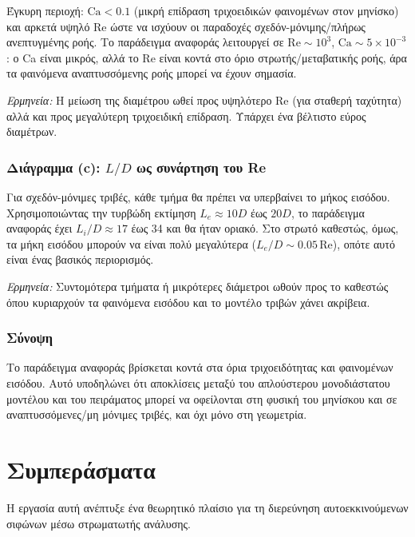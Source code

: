 \documentclass[11pt]{article}
\begin{document}
Έγκυρη περιοχή: $\text{Ca} < 0.1$ (μικρή επίδραση τριχοειδικών φαινομένων στον μηνίσκο) και αρκετά υψηλό Re ώστε να ισχύουν οι παραδοχές σχεδόν-μόνιμης/πλήρως ανεπτυγμένης ροής. Το παράδειγμα αναφοράς λειτουργεί σε $\text{Re} \sim 10^3$, $\text{Ca} \sim 5\times 10^{-3}$: ο Ca είναι μικρός, αλλά το Re είναι κοντά στο όριο στρωτής/μεταβατικής ροής, άρα τα φαινόμενα αναπτυσσόμενης ροής μπορεί να έχουν σημασία.

\emph{Ερμηνεία:} Η μείωση της διαμέτρου ωθεί προς υψηλότερο Re (για σταθερή ταχύτητα) αλλά και προς μεγαλύτερη τριχοειδική επίδραση. Υπάρχει ένα βέλτιστο εύρος διαμέτρων.

\subsubsection{Διάγραμμα (c): $L/D$ ως συνάρτηση του Re}

Για σχεδόν-μόνιμες τριβές, κάθε τμήμα θα πρέπει να υπερβαίνει το μήκος εισόδου. Χρησιμοποιώντας την τυρβώδη εκτίμηση $L_e \approx 10D$ έως $20D$, το παράδειγμα αναφοράς έχει $L_i/D \approx 17$ έως 34 και θα ήταν οριακό. Στο στρωτό καθεστώς, όμως, τα μήκη εισόδου μπορούν να είναι πολύ μεγαλύτερα ($L_e/D \sim 0.05\,\text{Re}$), οπότε αυτό είναι ένας βασικός περιορισμός.

\emph{Ερμηνεία:} Συντομότερα τμήματα ή μικρότερες διάμετροι ωθούν προς το καθεστώς όπου κυριαρχούν τα φαινόμενα εισόδου και το μοντέλο τριβών χάνει ακρίβεια.

\subsubsection{Σύνοψη}

Το παράδειγμα αναφοράς βρίσκεται κοντά στα όρια τριχοειδότητας και φαινομένων εισόδου. Αυτό υποδηλώνει ότι αποκλίσεις μεταξύ του απλούστερου μονοδιάστατου μοντέλου και του πειράματος μπορεί να οφείλονται στη φυσική του μηνίσκου και σε αναπτυσσόμενες/μη μόνιμες τριβές, και όχι μόνο στη γεωμετρία.

\section{Συμπεράσματα}
\label{sec:conclusion}

Η εργασία αυτή ανέπτυξε ένα θεωρητικό πλαίσιο για τη διερεύνηση αυτοεκκινούμενων σιφώνων μέσω στρωματωτής ανάλυσης.
\end{document}
